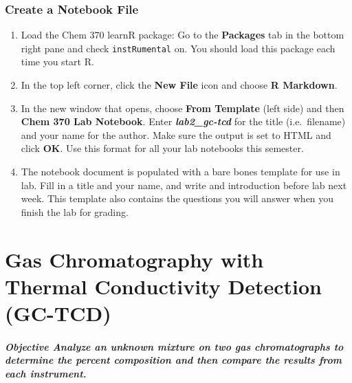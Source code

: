 \documentclass[]{tufte-book}
\providecommand{\tightlist}{%
  \setlength{\itemsep}{0pt}\setlength{\parskip}{0pt}}
\begin{document}
\hypertarget{create-a-notebook-file}{%
\subsection{Create a Notebook File}\label{create-a-notebook-file}}

\begin{enumerate}
\def\labelenumi{\arabic{enumi}.}
\tightlist
\item
  Load the Chem 370 learnR package: Go to the \textbf{Packages} tab in the bottom right pane and check \texttt{instRumental} on. You should load this package each time you start R.
\item
  In the top left corner, click the \textbf{New File} icon and choose \textbf{R Markdown}.
\item
  In the new window that opens, choose \textbf{From Template} (left side) and then \textbf{Chem 370 Lab Notebook}. Enter \textbf{\emph{lab2\_gc-tcd}} for the title (i.e.~filename) and your name for the author. Make sure the output is set to HTML and click \textbf{OK}. Use this format for all your lab notebooks this semester.
\item
  The notebook document is populated with a bare bones template for use in lab. Fill in a title and your name, and write and introduction before lab next week. This template also contains the questions you will answer when you finish the lab for grading.
\end{enumerate}

\hypertarget{gas-chromatography-with-thermal-conductivity-detection-gc-tcd}{%
\chapter{Gas Chromatography with Thermal Conductivity Detection (GC-TCD)}\label{gas-chromatography-with-thermal-conductivity-detection-gc-tcd}}

\hypertarget{objective-analyze-an-unknown-mixture-on-two-gas-chromatographs-to-determine-the-percent-composition-and-then-compare-the-results-from-each-instrument.}{%
\paragraph{\texorpdfstring{\textbf{Objective} \textbar{} Analyze an unknown mixture on two gas chromatographs to determine the percent composition and then compare the results from each instrument.}{Objective \textbar{} Analyze an unknown mixture on two gas chromatographs to determine the percent composition and then compare the results from each instrument.}}\label{objective-analyze-an-unknown-mixture-on-two-gas-chromatographs-to-determine-the-percent-composition-and-then-compare-the-results-from-each-instrument.}}
\end{document}

